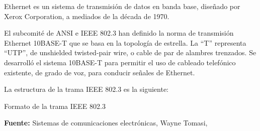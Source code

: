 \documentclass[../principal]{subfiles}
\begin{document}
  Ethernet es un sistema de transmisión de datos en banda base, diseñado por Xerox Corporation, a mediados de la década de 1970.

  El subcomité de ANSI e IEEE 802.3 han definido la norma de transmisión Ethernet 10BASE-T que se basa en la topología de estrella. La ``T'' representa ``UTP'', de unshielded twisted-pair
wire, o cable de par de alambres trenzados. Se desarrolló el sistema 10BASE-T para permitir el uso de cableado telefónico existente, de grado de voz, para conducir señales de Ethernet.\cite{libro:sistemas_de_comunicaciones_electronicas}

  La estructura de la trama IEEE 802.3 es la siguiente:

  \begin{table}[h]
    \scriptsize
    \centering
    \caption{Formato de la trama IEEE 802.3}
    
    \caption*{\textbf{Fuente:} Sistemas de comunicaciones electrónicas, Wayne Tomasi, \cite[p.~657]{libro:sistemas_de_comunicaciones_electronicas}}
  \end{table}
\end{document}
